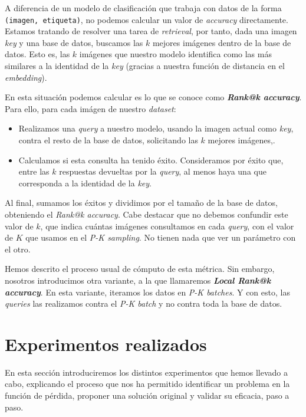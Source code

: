 A diferencia de un modelo de clasificación que trabaja con datos de la forma \lstinline{(imagen, etiqueta)}, no podemos calcular un valor de \textit{accuracy} directamente. Estamos tratando de resolver una tarea de \textit{retrieval}, por tanto, dada una imagen \textit{key} y una base de datos, buscamos las $k$  mejores imágenes dentro de la base de datos. Esto es, las $k$ imágenes que nuestro modelo identifica como las más similares a la identidad de la \textit{key} (gracias a nuestra función de distancia en el \textit{embedding}).

En esta situación podemos calcular es lo que se conoce como \textbf{\textit{Rank@k accuracy}}. Para ello, para cada imágen de nuestro \textit{dataset}:

\begin{itemize}
    \item Realizamos una \textit{query} a nuestro modelo, usando la imagen actual como \textit{key}, contra el resto de la base de datos, solicitando las $k$ mejores imágenes,.
    \item Calculamos si esta consulta ha tenido éxito. Consideramos por éxito que, entre las $k$ respuestas devueltas por la \textit{query}, al menos haya una que corresponda a la identidad de la \textit{key}.
\end{itemize}

Al final, sumamos los éxitos y dividimos por el tamaño de la base de datos, obteniendo el \textit{Rank@k accuracy}. Cabe destacar que no debemos confundir este valor de $k$, que indica cuántas imágenes consultamos en cada \textit{query}, con el valor de $K$ que usamos en el \textit{P-K sampling}. No tienen nada que ver un parámetro con el otro.

Hemos descrito el proceso usual de cómputo de esta métrica. Sin embargo, nosotros introducimos otra variante, a la que llamaremos \textbf{\textit{Local Rank@k accuracy}}. En esta variante, iteramos los datos en \textit{P-K batches}. Y con esto, las \textit{queries} las realizamos contra el \textit{P-K batch} y no contra toda la base de datos.


\section{Experimentos realizados} \label{isec:experimentos_realizados}

En esta sección introduciremos los distintos experimentos que hemos llevado a cabo, explicando el proceso que nos ha permitido identificar un problema en la función de pérdida, proponer una solución original y validar su eficacia, paso a paso.

